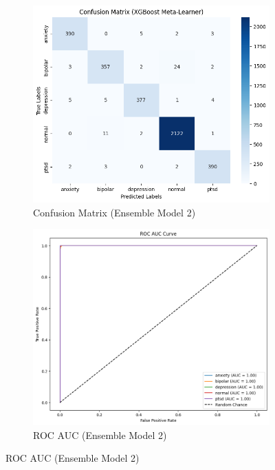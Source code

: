\vspace{-1em}

\begin{figure}[h!]
    \centering
    \begin{subfigure}[b]{0.47\textwidth}
        \centering
        \includegraphics[width=\textwidth]{Images/EM2 CM.png}
        \caption*{Confusion Matrix (Ensemble Model 2)}
        \label{em2 cm}  %
    \end{subfigure}
    \hfill
    \begin{subfigure}[b]{0.47\textwidth}
        \centering
        \includegraphics[width=\textwidth]{Images/EM2 ROC.png}
        \caption*{ROC AUC (Ensemble Model 2)}
        \label{em2 roc}  %
    \end{subfigure}
    \label{fig:ensemble_model2_comparison}
\end{figure}

